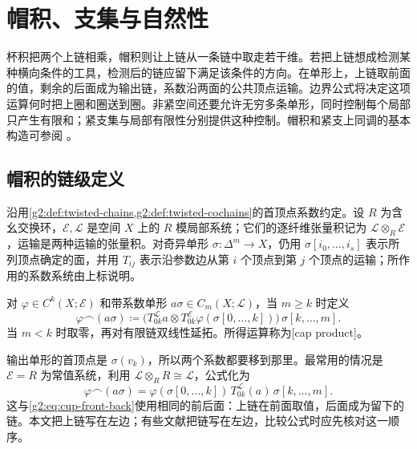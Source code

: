 
% 
% 

\section{帽积、支集与自然性}
\label{g2:sec:0602}

杯积把两个上链相乘，帽积则让上链从一条链中取走若干维。若把上链想成检测某种横向条件的工具，检测后的链应留下满足该条件的方向。在单形上，上链取前面的值，剩余的后面成为输出链，系数沿两面的公共顶点运输。边界公式将决定这项运算何时把上圈和圈送到圈。非紧空间还要允许无穷多条单形，同时控制每个局部只产生有限和；紧支集与局部有限性分别提供这种控制。帽积和紧支上同调的基本构造可参阅 \cite[第3.3节]{Hatcher2002}。

\subsection{帽积的链级定义}
\label{g2:subsec:0602:01}
沿用\cref{g2:def:twisted-chains,g2:def:twisted-cochains}的首顶点系数约定。设 \(R\) 为含幺交换环，\(\mathcal E,\mathcal L\) 是空间 \(X\) 上的 \(R\) 模局部系统；它们的逐纤维张量积记为 \(\mathcal L\otimes_R\mathcal E\)，运输是两种运输的张量积。对奇异单形 \(\sigma:\Delta^m\to X\)，仍用 \(\sigma[i_0,\ldots,i_s]\) 表示所列顶点确定的面，并用 \(T_{ij}\) 表示沿参数边从第 \(i\) 个顶点到第 \(j\) 个顶点的运输；所作用的系数系统由上标说明。

\begin{definition}[帽积]\label{g2:def:cap-product}
	对 \(\varphi\in C^k(X;\mathcal E)\) 和带系数单形 \(a\sigma\in C_m(X;\mathcal L)\)，当 \(m\ge k\) 时定义
	\begin{equation}\label{g2:eq:cap-front-back}
		\varphi\frown(a\sigma)
		\coloneqq\bigl(T^{\mathcal L}_{0k}a\otimes
		T^{\mathcal E}_{0k}\varphi(\sigma[0,\ldots,k])\bigr)\,\sigma[k,\ldots,m].
	\end{equation}
	当 \(m<k\) 时取零，再对有限链双线性延拓。所得运算称为[cap product]。
\end{definition}

输出单形的首顶点是 \(\sigma(v_k)\)，所以两个系数都要移到那里。最常用的情况是 \(\mathcal E=R\) 为常值系统，利用 \(\mathcal L\otimes_R R\cong\mathcal L\)，公式化为
\[
	\varphi\frown(a\sigma)
	=\varphi(\sigma[0,\ldots,k])\,T^{\mathcal L}_{0k}(a)\,\sigma[k,\ldots,m].
\]
这与\eqref{g2:eq:cup-front-back}使用相同的前后面：上链在前面取值，后面成为留下的链。本文把上链写在左边；有些文献把链写在左边，比较公式时应先核对这一顺序。

